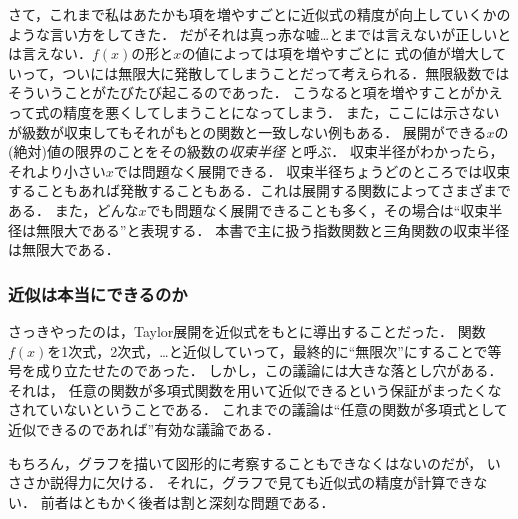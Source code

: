 さて，これまで私はあたかも項を増やすごとに近似式の精度が向上していくかのような言い方をしてきた．
だがそれは真っ赤な嘘…とまでは言えないが正しいとは言えない．$f(x)$の形と$x$の値によっては項を増やすごとに
式の値が増大していって，ついには無限大に発散してしまうことだって考えられる．無限級数ではそういうことがたびたび起こるのであった．
こうなると項を増やすことがかえって式の精度を悪くしてしまうことになってしまう．
また，ここには示さないが級数が収束してもそれがもとの関数と一致しない例もある．
展開ができる$x$の(絶対)値の限界のことをその級数の\emph{収束半径}
と呼ぶ．
収束半径がわかったら，それより小さい$x$では問題なく展開できる．
収束半径ちょうどのところでは収束することもあれば発散することもある．これは展開する関数によってさまざまである．
また，どんな$x$でも問題なく展開できることも多く，その場合は``収束半径は無限大である''と表現する．
本書で主に扱う指数関数と三角関数の収束半径は無限大である．

\subsubsection{近似は本当にできるのか}
さっきやったのは，Taylor展開を近似式をもとに導出することだった．
関数$f(x)$を1次式，2次式，…と近似していって，最終的に``無限次''にすることで等号を成り立たせたのであった．
しかし，この議論には大きな落とし穴がある．それは，
任意の関数が多項式関数を用いて近似できるという保証がまったくなされていないということである．
これまでの議論は``任意の関数が多項式として近似できるのであれば''有効な議論である．

もちろん，グラフを描いて図形的に考察することもできなくはないのだが，
いささか説得力に欠ける．
それに，グラフで見ても近似式の精度が計算できない．
前者はともかく後者は割と深刻な問題である．

